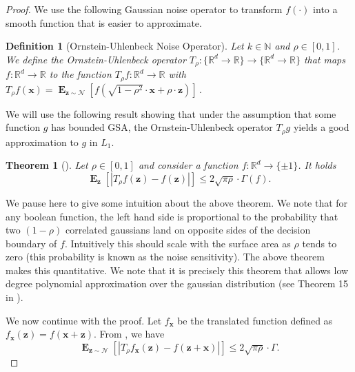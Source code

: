 \documentclass[10pt,a4paper]{article}
\newtheorem{theorem}{Theorem}[section]
\newtheorem{definition}{Definition}[section]
\renewcommand\vec[1]{\mathbf{#1}}
\DeclareMathOperator*{\E}{\mathbf{E}}
\newcommand{\R}{\mathbb{R}}
\newcommand{\N}{\mathbb{N}}
\newcommand{\1}{\Ind}
\newcommand{\x}{\vec x}
\newcommand{\z}{\vec z}
\newcommand{\Gauss}{\mathcal{N}}
\newcommand{\ouoperator}{T}
\begin{document}
\begin{proof}
We use the following Gaussian noise operator to transform $f(\cdot)$ into a smooth function 
that is easier to approximate.
\begin{definition}[Ornstein-Uhlenbeck Noise Operator]\label{definition:orstein-uhlenbeck}
    Let $k\in \N$ and $\rho\in [0,1]$. 
    We define the Ornstein-Uhlenbeck operator $\ouoperator_{\rho}:\{\R^d \to\R\} \to \{\R^d \to\R\}$ that maps $f:\R^d\to\R$ to the function $\ouoperator_\rho f:\R^d \to \R$ with 
    \(
        \ouoperator_{\rho}f(\x)=\E_{\z\sim \Gauss}[f(\sqrt{1-\rho^2} \cdot \x+\rho\cdot  \z )]\,.
    \)
\end{definition}
    
    We will use the following result showing that under the assumption that 
    some function $g$ has bounded GSA, the Ornstein-Uhlenbeck operator $T_\rho g$ 
    yields a good approximation to $g$ in $L_1$.
    \begin{theorem}[\cite{Pisier:86, ledoux1994}]
    \label{prop:ou_boolean}
        Let $\rho\in [0,1]$ and consider a function $f:\R^d \to \{\pm 1\}$. It holds
       \[
       \E_\z\left[ \left| \ouoperator_\rho f(\z) - f(\z) \right| \right] \le 2\sqrt{\pi \rho} \cdot \Gamma(f).
       \]
    \end{theorem}
    We pause here to give some intuition about the above theorem. We note that for any boolean function, the left hand side is proportional to the probability that two $(1-\rho)$ correlated gaussians land on opposite sides of the decision boundary of $f$. Intuitively this should scale with the surface area as $\rho$ tends to zero (this probability is known as the noise sensitivity). The above theorem makes this quantitative. We note that it is precisely this theorem that allows low degree polynomial approximation over the gaussian distribution (see Theorem 15 in \cite{KOS:08}).

We now continue with the proof. Let $f_{\x}$ be the translated function defined as $f_{\x}(\z)=f(\x+\z)$.  
From , we have 
$$\E_{\z\sim \mathcal{N}}\left[\left|T_\rho f_{\x}(\z)-f(\z+\x)\right|\right]\leq  2\sqrt{\pi\rho}\cdot \Gamma.$$ 


\end{proof}
\end{document}
